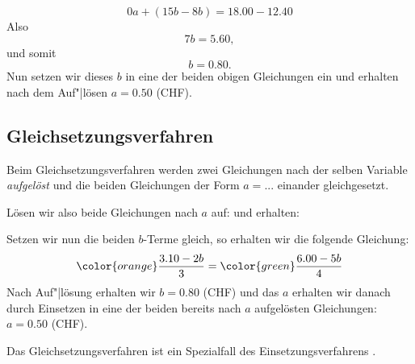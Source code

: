 $$0a  + (15b - 8b)  = 18.00 - 12.40$$
Also
$$7b = 5.60,$$ und somit
$$b = 0.80.$$
Nun setzen wir dieses $b$ in eine der beiden obigen Gleichungen ein und erhalten nach dem Auf"|lösen $a=0.50$ (CHF).
\newpage


\newpage


\subsection{Gleichsetzungsverfahren}\label{lin_gl_gleichsetzungsverfahren}
Beim Gleichsetzungsverfahren werden zwei Gleichungen nach der selben Variable \textit{aufgelöst} und die beiden Gleichungen der Form $a = ...$ einander gleichgesetzt.

Lösen wir also beide Gleichungen nach $a$ auf:
und erhalten:



Setzen wir nun die beiden $b$-Terme gleich, so erhalten wir die folgende Gleichung:
$${\color{orange}\frac{3.10 - 2b}{3}} = {\color{green}\frac{6.00 - 5b}{4}}$$
Nach Auf"|lösung erhalten wir $b=0.80$ (CHF) und das $a$ erhalten wir danach durch Einsetzen in eine der beiden bereits nach $a$ aufgelösten Gleichungen: $a=0.50$ (CHF).

Das Gleichsetzungsverfahren ist ein Spezialfall des
Einsetzungsverfahrens .
\newpage


\newpage

